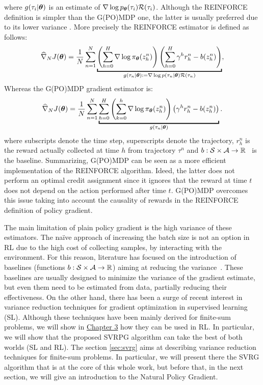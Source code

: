 where $g(\tau_i|\boldsymbol{\theta})$ is an estimate of $\nabla\log p_{\boldsymbol{\theta}}(\tau_i)\mathcal{R}(\tau_i)$.
Although the REINFORCE definition is simpler than the G(PO)MDP one, the latter is usually preferred due to its lower variance \citep{zhao2011analysis}. More precisely the REINFORCE estimator is defined as follows:
\begin{align*}
\gradApp{\vtheta}{N} = \frac{1}{N}\sum_{n=1}^{N}
\underbracket{
	\left(\sum_{h=0}^{H}\nabla \log \pol(z_h^n) \right)\left(\sum_{h=0}^{H}\gamma^h 
	r_h^n
	- b(z_h^n)\right)
}_{g(\tau_n|\vtheta):=\nabla \log p(\tau_n|\vtheta)\Reward(\tau_n)}
,
\end{align*}
Whereas the G(PO)MDP gradient estimator is:
\begin{align*}
\gradApp{\vtheta}{N} = \frac{1}{N}\sum_{n=1}^{N}
\underbracket{
	\sum_{h=0}^{H}\left(\sum_{k=0}^{h} \nabla \log \pol (z_h^n) \right)\left(\gamma^h 
	r_h^n
	- b(z^n_h)\right)
}_{g(\tau_n|\vtheta)}.
\end{align*}
where subscripts denote the time step, superscripts denote the trajectory, $r_h^n$ is the reward actually collected at time $h$ from trajectory $\tau^n$ and $b : \mathcal{S}\times\mathcal{A} \to \mathbb R$~\citep[\eg][]{Thomas2017actionbaseline} is the baseline.
Summarizing, G(PO)MDP can be seen as a more efficient implementation of the REINFORCE algorithm. 
Ideed, the latter does not perform an optimal credit assignment since it ignores that the reward at time $t$ does not depend on the action performed after time $t$.
G(PO)MDP overcomes this issue taking into account the causality of rewards in the REINFORCE definition of policy gradient.




The main limitation of plain policy gradient is the high variance of these estimators.
The na\"ive approach of increasing the batch size is not an option in \acs{RL} due to the high cost of collecting samples, \ie by interacting with the environment.
For this reason, literature has focused on the introduction of baselines (\ie functions $b : \mathcal{S} \times \mathcal{A} \to \mathbb R$) aiming at reducing the variance~\citep[\eg][]{williams1992simple,Peters2008reinf,Thomas2017actionbaseline,wu2018variance}.
These baselines are usually designed to minimize the variance of the gradient estimate, but even them need to be estimated from data, partially reducing their effectiveness.
On the other hand, there has been a surge of recent interest in variance reduction techniques for gradient optimization in supervised learning (\acs{SL}).
Although these techniques have been mainly derived for finite-sum problems, we will show in \hyperref[chap:svrpg]{Chapter 3} how they can be used in \acs{RL}.
In particular, we will show that the proposed \acs{SVRPG} algorithm can take the best of both worlds (\ie \acs{SL} and \acs{RL}).
The section \ref{sec:svrg} aims at describing variance reduction techniques for finite-sum problems. In particular, we will present there the \acs{SVRG} algorithm that is at the core of this whole work, but before that, in the next section, we will give an introduction to the Natural Policy Gradient.


